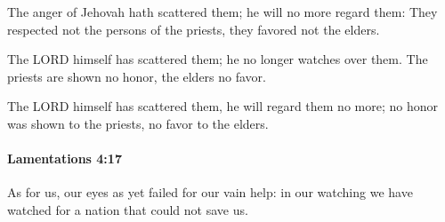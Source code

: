 			\begin{versebox}
					\item[BHS] 
					\item[LXX] 
					\item[ASV] The anger of Jehovah hath scattered them; he will no more regard them: They respected not the persons of the priests, they favored not the elders.
					\item[NIV] The LORD himself has scattered them; he no longer watches over them. The priests are shown no honor, the elders no favor.
					\item[NRSV] The LORD himself has scattered them, he will regard them no more; no honor was shown to the priests, no favor to the elders.
			\end{versebox}

		\paragraph{Lamentations 4:17} %
			\label{LAMENTATIONS-4-17}

			As for us, our eyes as yet failed for our vain help: in our watching we have watched for a nation that could not save us.

